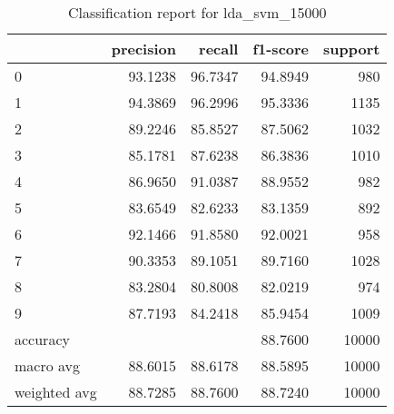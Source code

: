 \begin{table}[htb!]
\centering
\begin{tabular}{lrrrr}
    \toprule
    & precision & recall & f1-score & support \\
\midrule
0 & 93.1238 & 96.7347 & 94.8949 & 980 \\
1 & 94.3869 & 96.2996 & 95.3336 & 1135 \\
2 & 89.2246 & 85.8527 & 87.5062 & 1032 \\
3 & 85.1781 & 87.6238 & 86.3836 & 1010 \\
4 & 86.9650 & 91.0387 & 88.9552 & 982 \\
5 & 83.6549 & 82.6233 & 83.1359 & 892 \\
6 & 92.1466 & 91.8580 & 92.0021 & 958 \\
7 & 90.3353 & 89.1051 & 89.7160 & 1028 \\
8 & 83.2804 & 80.8008 & 82.0219 & 974 \\
9 & 87.7193 & 84.2418 & 85.9454 & 1009 \\
accuracy & & & 88.7600 & 10000 \\
macro avg & 88.6015 & 88.6178 & 88.5895 & 10000 \\
weighted avg & 88.7285 & 88.7600 & 88.7240 & 10000 \\
\bottomrule
\end{tabular}
\caption{Classification report for lda\_svm\_15000}
\label{tab:classification-report-lda_svm_15000}
\end{table}
